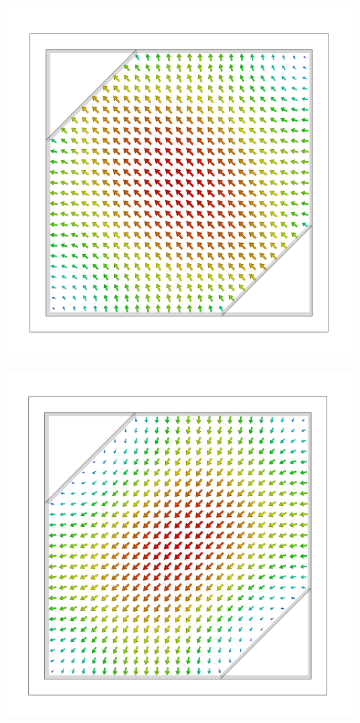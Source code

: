 \documentclass[11pt,a4paper,twoside,openany]{report}
\begin{document}
\begin{figure}[!ht]
    \centering
    \begin{subfigure}{.45\textwidth}
        \centering
        \includegraphics[width=.7\textwidth]{src/polarizer_square_mode1.png}
        \caption{\label{fig:square-polarizer-mode1}}
    \end{subfigure}
    \hspace{0.5cm}
    \begin{subfigure}{.45\textwidth}
        \centering
        \includegraphics[width=.7\textwidth]{src/polarizer_square_mode2.png}
        \caption{\label{fig:square-polarizer-mode2}}
    \end{subfigure}
    \\
    \begin{subfigure}{.45\textwidth}
        \centering

\end{subfigure}
\end{figure}
\end{document}

